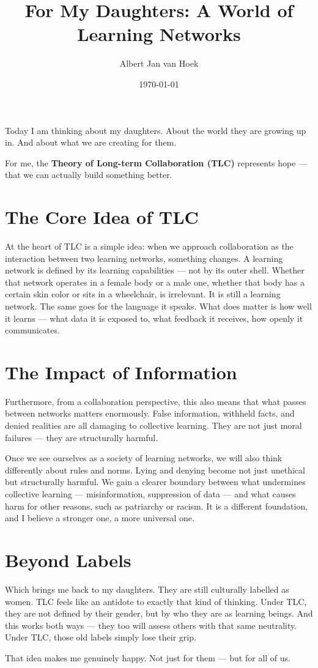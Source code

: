 \documentclass{article}
\title{For My Daughters: A World of Learning Networks}
\author{Albert Jan van Hoek}
\date{\today}
\begin{document}
\maketitle

Today I am thinking about my daughters. About the world they are growing up in. And about what we are creating for them.

For me, the \textbf{Theory of Long-term Collaboration (TLC)} represents hope — that we can actually build something better.

\section*{The Core Idea of TLC}

At the heart of TLC is a simple idea: when we approach collaboration as the interaction between two learning networks, something changes. A learning network is defined by its learning capabilities — not by its outer shell. Whether that network operates in a female body or a male one, whether that body has a certain skin color or sits in a wheelchair, is irrelevant. It is still a learning network. The same goes for the language it speaks. What does matter is how well it learns — what data it is exposed to, what feedback it receives, how openly it communicates.

\section*{The Impact of Information}

Furthermore, from a collaboration perspective, this also means that what passes between networks matters enormously. False information, withheld facts, and denied realities are all damaging to collective learning. They are not just moral failures — they are structurally harmful.

Once we see ourselves as a society of learning networks, we will also think differently about rules and norms. Lying and denying become not just unethical but structurally harmful. We gain a clearer boundary between what undermines collective learning — misinformation, suppression of data — and what causes harm for other reasons, such as patriarchy or racism. It is a different foundation, and I believe a stronger one, a more universal one.

\section*{Beyond Labels}

Which brings me back to my daughters. They are still culturally labelled as women. TLC feels like an antidote to exactly that kind of thinking. Under TLC, they are not defined by their gender, but by who they are as learning beings. And this works both ways — they too will assess others with that same neutrality. Under TLC, those old labels simply lose their grip.

That idea makes me genuinely happy. Not just for them — but for all of us.
\end{document}
